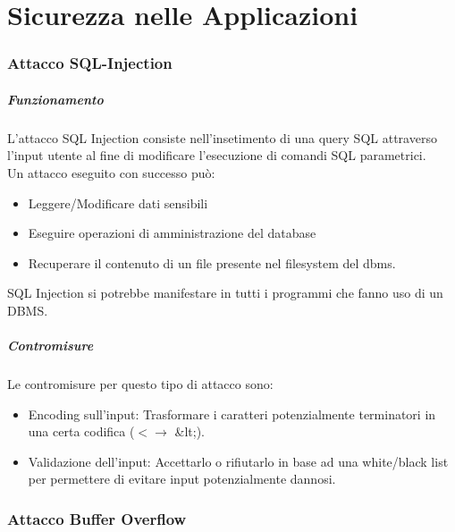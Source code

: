 \documentclass[12pt, a4paper, openany]{book}
\begin{document}


\chapter{Sicurezza nelle Applicazioni}
\subsection{Attacco SQL-Injection}
\paragraph*{Funzionamento}
L'attacco SQL Injection consiste nell'insetimento di una query SQL attraverso l'input utente al fine di modificare l'esecuzione di comandi SQL parametrici.
\\Un attacco eseguito con successo può:
\begin{itemize}
    \item Leggere/Modificare dati sensibili
    \item Eseguire operazioni di amministrazione del database
    \item Recuperare il contenuto di un file presente nel filesystem del dbms.
\end{itemize}
SQL Injection si potrebbe manifestare in tutti i programmi che fanno uso di un DBMS.
\paragraph*{Contromisure} Le contromisure per questo tipo di attacco sono:
\begin{itemize}
    \item Encoding sull'input: Trasformare i caratteri potenzialmente terminatori in una certa codifica ($< \to $ \&lt;).
    \item Validazione dell'input: Accettarlo o rifiutarlo in base ad una white/black list per permettere di evitare input potenzialmente dannosi.
\end{itemize}

\subsection{Attacco Buffer Overflow}
\end{document}
